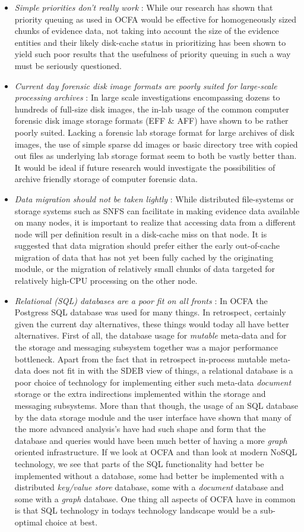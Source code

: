 \begin{itemize}
\item \emph{Simple priorities don't really work} : While our research has shown that priority queuing as used in OCFA would be effective for homogeneously sized chunks of evidence data, not taking into account the size of the evidence entities and their likely disk-cache status in prioritizing has been shown to yield such poor results that the usefulness of priority queuing in such a way must be seriously questioned. 
\item \emph{Current day forensic disk image formats are poorly suited for large-scale processing archives} : In large scale investigations encompassing dozens to hundreds of full-size disk images, the in-lab usage of the common computer forensic disk image storage formats (EFF \& AFF) have shown to be rather poorly suited. Lacking a forensic lab storage format for large archives of disk images, the use of simple sparse dd images or basic directory tree with copied out files as underlying lab storage format seem to both be vastly better than. It would be ideal if future research would investigate the possibilities of archive friendly storage of computer forensic data.
\item \emph{Data migration should not be taken lightly} : While distributed file-systems or storage systems such as SNFS can facilitate in making evidence data available on many nodes, it is important to realize that accessing data from a different node will per definition result in a disk-cache miss on that node. It is suggested that data migration should prefer either the early out-of-cache migration of data that has not yet been fully cached by the originating module, or the migration of relatively small chunks of data targeted for relatively high-CPU processing on the other node. 
\item \emph{Relational (SQL) databases are a poor fit on all fronts} : In OCFA the Postgress SQL database was used for many things. In retrospect, certainly given the current day alternatives, these things would today all have better alternatives. First of all, the database usage for \emph{mutable} meta-data and for the storage and messaging subsystem together was a major performance bottleneck. Apart from the fact that in retrospect in-process mutable meta-data does not fit in with the SDEB view of things, a relational database is a poor choice of technology for implementing either such meta-data \emph{document} storage or the extra indirections implemented within the storage and messaging subsystems. More than that though, the usage of an SQL database by the data storage module and the user interface have shown that many of the more advanced analysis's have had such shape and form that the database and queries would have been much better of having a more \emph{graph} oriented infrastructure. If we look at OCFA and than look at modern NoSQL technology, we see that parts of the SQL functionality had better be implemented without a database, some had better be implemented with a distributed \emph{key/value store} database, some with a \emph{document} database and some with a \emph{graph} database.  One thing all aspects of OCFA have in common is that SQL technology in todays technology landscape would be a sub-optimal choice at best. 

\end{itemize}

